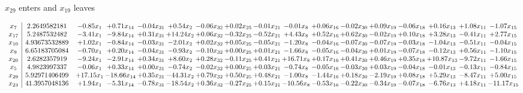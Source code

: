 \documentclass[9pt]{article}
\begin{document}
 $ x_{29} $ enters and $ x_{19} $ leaves 

 \[\begin{array}{c| c c@{\hskip 2pt} c@{\hskip 2pt} c@{\hskip 2pt} c@{\hskip 2pt} c@{\hskip 2pt} c@{\hskip 2pt} c@{\hskip 2pt} c@{\hskip 2pt} c@{\hskip 2pt} c@{\hskip 2pt} c@{\hskip 2pt} c@{\hskip 2pt} c@{\hskip 2pt} c@{\hskip 2pt} c@{\hskip 2pt} }
 x_{7}   &  2.2649582181 & -0.85 x_{1} & +  0.71 x_{14} & -0.04 x_{31} & +  0.54 x_{2} & -0.06 x_{32} & +  0.02 x_{25} & -0.01 x_{21} & -0.01 x_{8} & +  0.06 x_{16} & -0.02 x_{30} & +  0.09 x_{19} & -0.06 x_{18} & +  0.16 x_{13} & +  1.08 x_{11} & -1.07 x_{15}\\
 x_{17}   &  5.2487532482 & -3.41 x_{1} & -9.84 x_{14} & +  0.31 x_{31} & + 14.24 x_{2} & +  0.06 x_{32} & -0.32 x_{25} & -0.52 x_{21} & +  4.43 x_{8} & +  0.52 x_{16} & +  0.62 x_{30} & -0.02 x_{19} & +  0.10 x_{18} & +  3.28 x_{13} & -0.41 x_{11} & +  2.77 x_{15}\\
 x_{10}   &  4.93673532889 & +  1.02 x_{1} & -0.84 x_{14} & -0.03 x_{31} & -2.01 x_{2} & +  0.02 x_{32} & +  0.05 x_{25} & -0.05 x_{21} & -1.20 x_{8} & -0.04 x_{16} & -0.07 x_{30} & -0.07 x_{19} & -0.03 x_{18} & -1.04 x_{13} & -0.51 x_{11} & -0.04 x_{15}\\
 x_{9}   &  6.65183705084 & -0.70 x_{1} & +  0.20 x_{14} & -0.04 x_{31} & -0.93 x_{2} & -0.10 x_{32} & +  0.00 x_{25} & +  0.01 x_{21} & -1.66 x_{8} & -0.05 x_{16} & -0.04 x_{30} & +  0.01 x_{19} & -0.07 x_{18} & -0.12 x_{13} & +  0.56 x_{11} & -1.10 x_{15}\\
 x_{20}   &  2.6282357919 & -9.24 x_{1} & -2.91 x_{14} & +  0.34 x_{31} & +  8.60 x_{2} & +  0.28 x_{32} & -0.11 x_{25} & +  0.41 x_{21} & + 16.71 x_{8} & +  0.17 x_{16} & +  0.41 x_{30} & +  0.46 x_{19} & +  0.35 x_{18} & + 10.87 x_{13} & -9.72 x_{11} & -1.66 x_{15}\\
 x_{5}   &  4.9823997337 & -0.06 x_{1} & +  0.33 x_{14} & +  0.00 x_{31} & -0.74 x_{2} & -0.02 x_{32} & +  0.00 x_{25} & +  0.03 x_{21} & -0.74 x_{8} & -0.05 x_{16} & -0.03 x_{30} & +  0.03 x_{19} & -0.04 x_{18} & -0.01 x_{13} & -0.13 x_{11} & -0.84 x_{15}\\
 x_{29}   &  5.92971406499 & + 17.15 x_{1} & -18.66 x_{14} & +  0.35 x_{31} & -44.31 x_{2} & +  0.79 x_{32} & +  0.50 x_{25} & +  0.48 x_{21} & -1.00 x_{8} & -1.44 x_{16} & +  0.18 x_{30} & -2.19 x_{19} & +  0.08 x_{18} & +  5.29 x_{13} & -8.47 x_{11} & +  5.00 x_{15}\\
 x_{23}   &  41.3957048136 & +  1.94 x_{1} & -5.31 x_{14} & -0.78 x_{31} & -18.54 x_{2} & +  0.36 x_{32} & -0.27 x_{25} & +  0.15 x_{21} & -10.56 x_{8} & -0.53 x_{16} & -0.22 x_{30} & -0.34 x_{19} & -0.07 x_{18} & -6.76 x_{13} & +  4.18 x_{11} & -11.17 x_{15}\\

\end{array}\]
\end{document}

